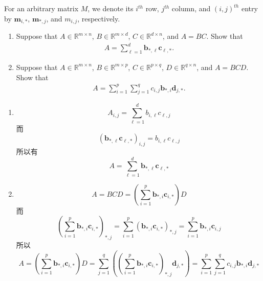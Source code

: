 \documentclass[11pt,letter,notitlepage]{article}
\begin{document}
\begin{solution}

\end{solution}

\newpage

\begin{exercise}
    For an arbitrary matrix $M$, we denote its $i^{th}$ row, $j^{th}$ column, and $(i,j)^{th}$ entry by $\mathbf{m}_{i,*}$, $\mathbf{m}_{*,j}$, and $m_{i,j}$, respectively.
    \begin{enumerate}
        \item Suppose that $A\in\mathbb{R}^{m\times n}$, $B\in\mathbb{R}^{m\times d}$, $C\in\mathbb{R}^{d\times n}$, and $A=BC$. Show that
              \begin{align*}
                  A=\sum_{\ell=1}^d\mathbf{b}_{*,\ell}\mathbf{c}_{\ell,*}.
              \end{align*}

        \item Suppose that $A\in\mathbb{R}^{m\times n}$, $B\in\mathbb{R}^{m\times p}$, $C\in\mathbb{R}^{p\times q}$, $D\in\mathbb{R}^{q\times n}$, and $A=BCD$. Show that
              \begin{align*}
                  A=\sum_{i=1}^p\sum_{j=1}^qc_{i,j}\mathbf{b}_{*,i}\mathbf{d}_{j,*}.
              \end{align*}
    \end{enumerate}
\end{exercise}

\begin{solution}
    \begin{enumerate}
        \item $$A_{i,j}=\sum_{\ell=1}^{d}{b_{i,\ell}c_{\ell,j}}$$
              而 $$\left( \mathbf{b}_{*,\ell}\mathbf{c}_{\ell,*} \right)_{i,j}
                  =b_{i,\ell}c_{\ell,j}$$
              所以有 $$A=\sum_{\ell=1}^d\mathbf{b}_{*,\ell}\mathbf{c}_{\ell,*}$$
        \item $$A= BCD  = \left( \sum_{i=1}^p\mathbf{b}_{*,i}\mathbf{c}_{i,*} \right) D$$
              而 $$\left( \sum_{i=1}^p\mathbf{b}_{*,i}\mathbf{c}_{i,*} \right)_{*,j}
                  =\sum_{i=1}^p \left( \mathbf{b}_{*,i}\mathbf{c}_{i,*}\right)_{*,j}
                  =\sum_{i=1}^p \mathbf{b}_{*,i}\mathbf{c}_{i,j}$$
              所以 $$A
                  =\left( \sum_{i=1}^p\mathbf{b}_{*,i}\mathbf{c}_{i,*} \right) D
                  =\sum_{j=1}^q \left( \left( \sum_{i=1}^p\mathbf{b}_{*,i}\mathbf{c}_{i,*} \right)_{*,j} \mathbf{d}_{j,*} \right)
                  =\sum_{i=1}^p\sum_{j=1}^qc_{i,j}\mathbf{b}_{*,i}\mathbf{d}_{j,*}$$
    \end{enumerate}
\end{solution}
\end{document}
